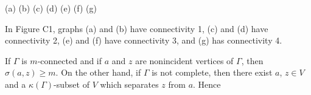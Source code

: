 (a) (b) (c) (d) (e) (f) (g)

In Figure C1, graphs (a) and (b) have connectivity 1, (c) and (d) have connectivity 2, (e) and (f) have connectivity 3, and (g) has connectivity 4.

If $\Gamma$ is $m$-connected and if $a$ and $z$ are nonincident vertices of $\Gamma$, then $\sigma(a, z) \geq m$. On the other hand, if $\Gamma$ is not complete, then there exist $a$, $z \in V$ and a $\kappa(\Gamma)$-subset of $V$ which separates $z$ from $a$. Hence
